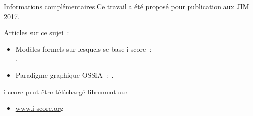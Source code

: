 \begin{block}{Informations complémentaires}
	Ce travail a été proposé pour publication aux JIM 2017.
      {Articles sur ce sujet~:
      \begin{itemize}
        \item Modèles formels sur lesquels se base i-score~:~\\\cite{allombert_system_2007,arias_modelling_2014}.
        \item Paradigme graphique OSSIA~:~\cite{celerier_ossia:_2015}.
      \end{itemize}
      \vspace{0.1in}\noindent i-score peut être téléchargé librement sur
      \begin{itemize}
        \item \url{www.i-score.org}
      \end{itemize}}
\end{block}